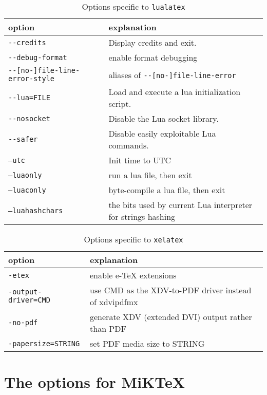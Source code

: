 \documentclass{article}
\newcommand{\lualatex}{\texttt{lualatex}}
\newcommand{\xelatex}{\texttt{xelatex}}
\newcommand{\miktex}{MiKTeX}
\begin{document}
{\small
\begin{longtable}{|ll|}
\toprule
option & explanation \\
\midrule
\midrule
\endfirsthead%
\bottomrule
\caption{\label{tab:latexOptionsLualatexTexlive} Options specific to \lualatex{} }
\endlastfoot%
\texttt{-{}-credits}                    & Display credits and exit. \\
\texttt{-{}-debug-format}               & enable format debugging \\
\texttt{-{}-[no-]file-line-error-style} & aliases of \texttt{-{}-[no-]file-line-error} \\
\texttt{-{}-lua=FILE}                   & Load and execute a lua initialization script. \\
\texttt{-{}-nosocket}                   & Disable the Lua socket library. \\
\texttt{-{}-safer}                      & Disable easily exploitable Lua commands. \\
\texttt{--utc}                          & Init time to UTC \\
\midrule
\texttt{--luaonly}                      & run a lua file, then exit \\
\texttt{--luaconly}                     & byte-compile a lua file, then exit \\
\texttt{--luahashchars}                 & the bits used by current Lua interpreter for strings hashing \\
\end{longtable}
}


{\small
\begin{longtable}{|ll|}
\toprule
option & explanation \\
\midrule
\midrule
\endfirsthead%
\bottomrule
\caption{\label{tab:latexOptionsXelatexTexlive} Options specific to \xelatex{} }
\endlastfoot%
\texttt{-etex}                   & enable e-TeX extensions \\
\texttt{-output-driver=CMD}      & use CMD as the XDV-to-PDF driver instead of xdvipdfmx \\
\texttt{-no-pdf}                 & generate XDV (extended DVI) output rather than PDF \\
\texttt{-papersize=STRING}       & set PDF media size to STRING \\
\end{longtable}
}

\section{The options for \miktex}\label{sec:optionsMiktex}
\end{document}
